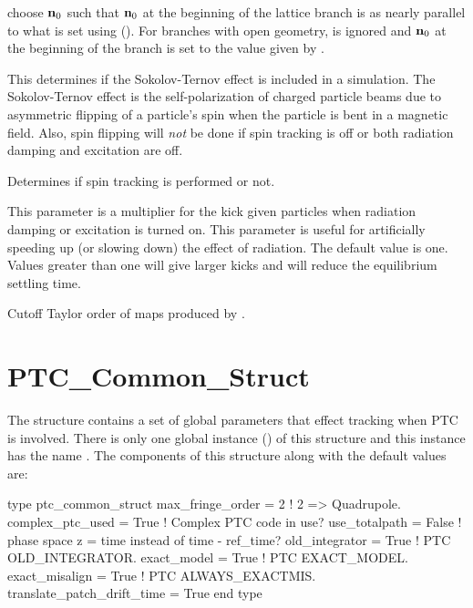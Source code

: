 {\begin{description}
choose ${\bf n}_0$ such that ${\bf n}_0$ at the beginning of the lattice branch is as nearly parallel to
what is set using  (). For branches with open geometry,
 is ignored and ${\bf n}_0$ at the beginning of the branch is set to
the value given by .
%
\item[\vn{spin_sokolov_ternov_flipping_on}] \Newline
This determines if the Sokolov-Ternov effect is included in a simulation.  The Sokolov-Ternov
effect\cite{b:barber99} is the self-polarization of charged particle beams due to asymmetric flipping
of a particle's spin when the particle is bent in a magnetic field. Also, spin flipping will {\em
not} be done if spin tracking is off or both radiation damping and excitation are off.
%
\item[\vn{spin_tracking_on}] \Newline
Determines if spin tracking is performed or not.
%
\item[\vn{synch_rad_scale}] \Newline
This parameter is a multiplier for the kick given particles when radiation damping or excitation is
turned on.  This parameter is useful for artificially speeding up (or slowing down) the effect of
radiation.  The default value is one. Values greater than one will give larger kicks and will reduce
the equilibrium settling time.
%
\item[\vn{taylor_order}] \Newline
Cutoff Taylor order of maps produced by .
\end{description}

\section{PTC_Common_Struct}
\label{s:ptc.common}

The  structure contains a set of global parameters that effect tracking when
PTC is involved. There is only one global instance () of this structure and
this instance has the name . The components of this structure along with the default
values are:
\begin{example}
  type ptc_common_struct
    max_fringe_order  = 2   ! 2 => Quadrupole.
    complex_ptc_used = True ! Complex PTC code in use? 
    use_totalpath  = False  ! phase space z = time instead of time - ref_time?
    old_integrator = True   ! PTC OLD_INTEGRATOR.
    exact_model    = True   ! PTC EXACT_MODEL.
    exact_misalign = True   ! PTC ALWAYS_EXACTMIS.
    translate_patch_drift_time = True  
  end type
\end{example}

}
